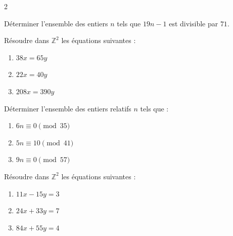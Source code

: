 \documentclass[a4paper,12pt]{article}
\begin{document}
\begin{multicols}{2}
    \begin{exercice}[title=Exercice 25 $\quad \star\star \quad$ { [Calculer, Raisonner] }]{}{}
    Déterminer l'ensemble des entiers $n$ tels que $19n-1$ est divisible par $71$.
    \end{exercice}
    
    \begin{exercice}[title=Exercice 26 $\quad \star \quad$ { [Calculer] }]{}{}
    Résoudre dans $\mathbb{Z}^2$ les équations suivantes :
    \begin{enumerate}
        \item $38x = 65y$
        \item $22x = 40y$
        \item $208x = 390y$
    \end{enumerate}
    \end{exercice}
    
    \begin{exercice}[title=Exercice 27 $\quad \star \quad$ { [Calculer] }]{}{}
    Déterminer l'ensemble des entiers relatifs $n$ tels que :
    \begin{enumerate}
        \item $6n \equiv 0 \pmod{35}$
        \item $5n \equiv 10 \pmod{41}$
        \item $9n \equiv 0 \pmod{57}$
    \end{enumerate}
    \end{exercice}
    
    \begin{exercice}[title=Exercice 28 $\quad \star\star \quad$ { [Calculer] }]{}{}
    Résoudre dans $\mathbb{Z}^2$ les équations suivantes :
    \begin{enumerate}
        \item $11x - 15y = 3$
        \item $24x + 33y = 7$
        \item $84x + 55y = 4$
    \end{enumerate}
    \end{exercice}
    

\end{multicols}
\end{document}
